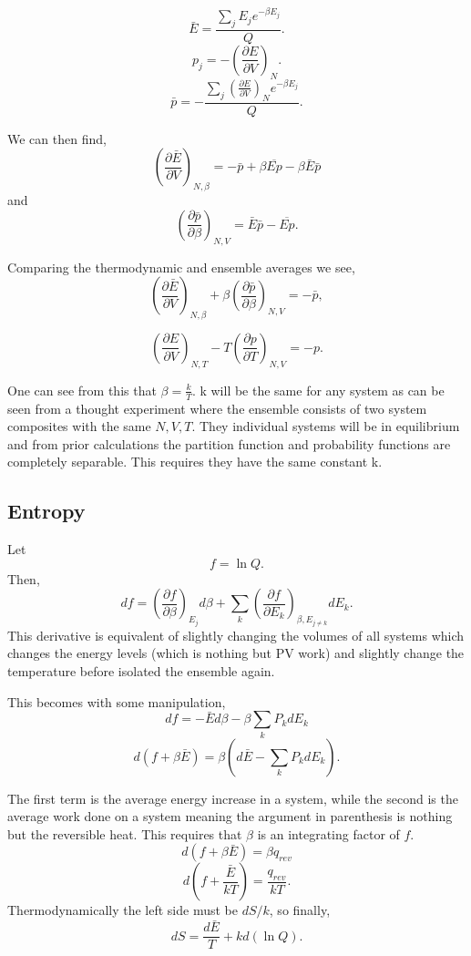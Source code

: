 \[\bar{E} = \frac{\sum_{j}{E_j e^{-\beta E_{j}}}}{Q}.\]
\[ p_j = - \left(\frac{\partial E}{\partial V}\right)_N.\]
\[ \bar{p} = - \frac{\sum_j{\left( \frac{\partial E}{\partial V} \right)_{N}
e^{-\beta E_j}}}{Q}.\]

We can then find,
\[ \left( \frac{ \partial \bar{E} }{ \partial V}\right)_{N, \beta} = -\bar{p}
+ \beta \overline{Ep} - \beta \bar{E} \bar{p} \] and
\[ \left( \frac{ \partial \bar{p} }{ \partial \beta }\right)_{N, V} =
\bar{E}\bar{p} - \overline{Ep}.\]

Comparing the thermodynamic and ensemble averages we see,
\[\left( \frac{ \partial \bar{E} }{ \partial V}\right)_{N, \beta} +
\beta \left( \frac{ \partial \bar{p} }{ \partial \beta }\right)_{N, V} =
- \bar{p},\]

\[\left( \frac{ \partial E }{ \partial V}\right)_{N, T} -
T \left( \frac{ \partial p }{ \partial T }\right)_{N, V} = - p.\]

One can see from this that $ \beta = \frac{k}{T} $. k will be the same for any
system as can be seen from a thought experiment where the ensemble consists of
two system composites with the same $N, V, T$. They individual systems will be
in equilibrium and from prior calculations the partition function and
probability functions are completely separable. This requires they have the same
constant k.

\subsection{Entropy}

Let \[f = \ln Q.\] Then, \[ df = \left( \frac{ \partial f }{ \partial \beta }
\right)_{E_{j}} d \beta + \sum_{k}{\left( \frac{ \partial f }{ \partial E_{k}}
\right)_{\beta, E_{j \neq k}} d E_{k}}.\] This derivative is equivalent of
slightly changing the volumes of all systems which changes the energy levels
(which is nothing but PV work) and slightly change the temperature before
isolated the ensemble again.

This becomes with some manipulation,
\[ df = -\bar{E} d \beta - \beta \sum_{k}{P_{k} dE_{k}} \]
\[ d(f + \beta \bar{E}) = \beta \left( d \bar{E} - \sum_{k}{P_{k} dE_{k}}
\right).\]

The first term is the average energy increase in a system, while the second is the
average work done on a system meaning the argument in parenthesis is nothing but
the reversible heat. This requires that $\beta$ is an integrating factor of $f$.
\[ d(f + \beta \bar{E}) = \beta q_{rev} \]
\[ d\left(f + \frac{ \bar{E} }{kT} \right) = \frac{q_{rev}}{kT}.\]
Thermodynamically the left side must be $ dS/k $, so finally,
\[ dS = \frac{d \bar{E}}{T} + k d( \ln Q).\]

